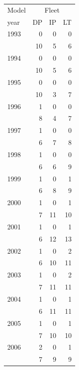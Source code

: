 \begin{tabular}{lrrr}
\toprule
Model & \multicolumn{3}{c}{Fleet} \\
year & DP & IP & LT \\
\midrule
1993 & 0 & 0 & 0 \\
 & 10 & 5 & 6 \\
1994 & 0 & 0 & 0 \\
 & 10 & 5 & 6 \\
1995 & 0 & 0 & 0 \\
 & 10 & 3 & 7 \\
1996 & 1 & 0 & 0 \\
 & 8 & 4 & 7 \\
1997 & 1 & 0 & 0 \\
 & 6 & 7 & 8 \\
1998 & 1 & 0 & 0 \\
 & 6 & 6 & 9 \\
1999 & 1 & 0 & 1 \\
 & 6 & 8 & 9 \\
2000 & 1 & 0 & 1 \\
 & 7 & 11 & 10 \\
2001 & 1 & 0 & 1 \\
 & 6 & 12 & 13 \\
2002 & 1 & 0 & 2 \\
 & 6 & 10 & 11 \\
2003 & 1 & 0 & 2 \\
 & 7 & 11 & 11 \\
2004 & 1 & 0 & 1 \\
 & 6 & 11 & 11 \\
2005 & 1 & 0 & 1 \\
 & 7 & 10 & 10 \\
2006 & 2 & 0 & 1 \\
 & 7 & 9 & 9 \\
\bottomrule
\end{tabular}

